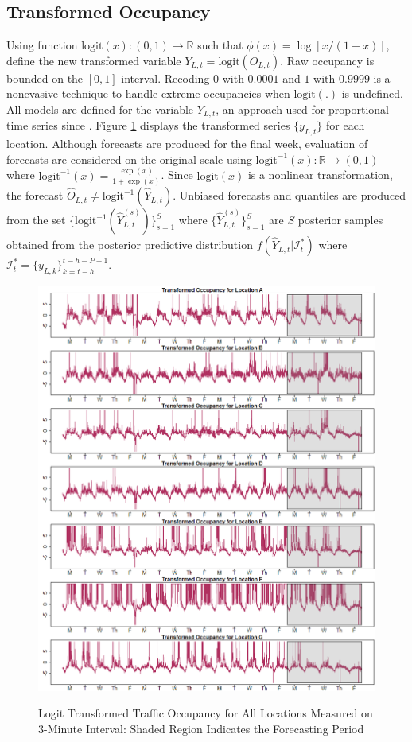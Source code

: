 \subsection{Transformed Occupancy}
Using function $\textrm{logit}(x):(0,1)\to\mathbb{R}$ such that $\phi(x)=\log [x/(1-x)]$, define the new transformed variable $Y_{L,t}=\textrm{logit}(O_{L,t})$. Raw occupancy is bounded on the $[0,1]$ interval. Recoding $0$ with $0.0001$ and $1$ with $0.9999$ is a nonevasive technique to handle extreme occupancies when $\textrm{logit}(.)$ is undefined. All models are defined for the variable $Y_{L,t}$, an approach used for proportional time series since \cite{Wallis1987}. Figure \ref{fig:TransPlotTrafficOcc} displays the transformed series $\{y_{L,t}\}$ for each location. Although forecasts are produced for the final week, evaluation of forecasts are considered on the original scale using $\textrm{logit}^{-1}(x):\mathbb{R}\to(0,1)$ where $\textrm{logit}^{-1}(x)=\frac{\exp(x)}{1+\exp(x)}$. Since $\textrm{logit}(x)$ is a nonlinear transformation, the forecast $\hat{O}_{L,t} \neq  \textrm{logit}^{-1}(\hat{Y}_{L,t})$. Unbiased forecasts and quantiles are produced from the set $\{\textrm{logit}^{-1}(\hat{Y}^{(s)}_{L,t})\}_{s=1}^{S}$ where $\{\hat{Y}^{(s)}_{L,t}\}_{s=1}^{S}$ are $S$ posterior samples obtained from the posterior predictive distribution $f(\hat{Y}_{L,t}|\mathcal{I}^*_t)$ where $\mathcal{I}^*_t=\{y_{L,k}\}_{k=t-h}^{t-h-P+1}$.

\begin{figure}[ht!]
\caption{Logit Transformed Traffic Occupancy for All Locations Measured on 3-Minute Interval: Shaded Region Indicates the Forecasting Period}
\includegraphics[width=\textwidth]{Transplots}
\label{fig:TransPlotTrafficOcc}
\end{figure}


